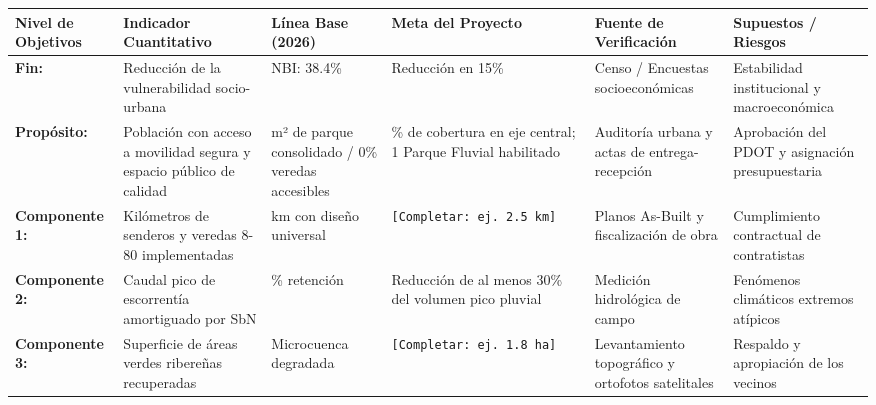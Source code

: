 \documentclass[
  letterpaper,
  DIV=11,
  numbers=noendperiod]{scrreprt}
\newcounter{none} %
\begin{document}
{\def\LTcaptype{none} %
\begin{longtable}[]{@{}
  >{\raggedright\arraybackslash}p{}
  >{\raggedright\arraybackslash}p{}
  >{\raggedright\arraybackslash}p{}
  >{\raggedright\arraybackslash}p{}
  >{\raggedright\arraybackslash}p{}
  >{\raggedright\arraybackslash}p{}@{}}
\toprule\noalign{}
\begin{minipage}[b]{\linewidth}\raggedright
Nivel de Objetivos
\end{minipage} & \begin{minipage}[b]{\linewidth}\raggedright
Indicador Cuantitativo
\end{minipage} & \begin{minipage}[b]{\linewidth}\raggedright
Línea Base (2026)
\end{minipage} & \begin{minipage}[b]{\linewidth}\raggedright
Meta del Proyecto
\end{minipage} & \begin{minipage}[b]{\linewidth}\raggedright
Fuente de Verificación
\end{minipage} & \begin{minipage}[b]{\linewidth}\raggedright
Supuestos / Riesgos
\end{minipage} \\
\midrule\noalign{}
\endhead
\bottomrule\noalign{}
\endlastfoot
\textbf{Fin:} & Reducción de la vulnerabilidad socio-urbana & NBI:
38.4\% & Reducción en 15\% & Censo / Encuestas socioeconómicas &
Estabilidad institucional y macroeconómica \\
\textbf{Propósito:} & Población con acceso a movilidad segura y espacio
público de calidad & 0 m² de parque consolidado / 0\% veredas accesibles
& 100\% de cobertura en eje central; 1 Parque Fluvial habilitado &
Auditoría urbana y actas de entrega-recepción & Aprobación del PDOT y
asignación presupuestaria \\
\textbf{Componente 1:} & Kilómetros de senderos y veredas 8-80
implementadas & 0.0 km con diseño universal &
\texttt{{[}Completar:\ ej.\ 2.5\ km{]}} & Planos As-Built y
fiscalización de obra & Cumplimiento contractual de contratistas \\
\textbf{Componente 2:} & Caudal pico de escorrentía amortiguado por SbN
& 0\% retención & Reducción de al menos 30\% del volumen pico pluvial &
Medición hidrológica de campo & Fenómenos climáticos extremos
atípicos \\
\textbf{Componente 3:} & Superficie de áreas verdes ribereñas
recuperadas & Microcuenca degradada &
\texttt{{[}Completar:\ ej.\ 1.8\ ha{]}} & Levantamiento topográfico y
ortofotos satelitales & Respaldo y apropiación de los vecinos \\
\end{longtable}
}
\end{document}
